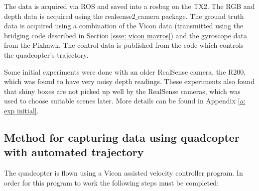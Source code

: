 \documentclass[12pt,a4paper]{article}
\begin{document}
  The data is acquired via ROS and saved into a rosbag on the TX2. The RGB and depth data is acquired using the realsense2$\_$camera package. The ground truth data is acquired using a combination of the Vicon data (transmitted using the bridging code described in Section \ref{ssse: vicon mavros}) and the gyroscope data from the Pixhawk. The control data is published from the code which controls the quadcopter's trajectory.
   
  Some initial experiments were done with an older RealSense camera, the R200, which was found to have very noisy depth readings. These experiments also found that shiny boxes are not picked up well by the RealSense cameras, which was used to choose suitable scenes later. More details can be found in Appendix \ref{a: exp initial}.

  \subsection{Method for capturing data using quadcopter with automated trajectory} 
    \label{ssec: method}
    The quadcopter is flown using a Vicon assisted velocity controller program. In order for this program to work the following steps must be completed:
\end{document}
